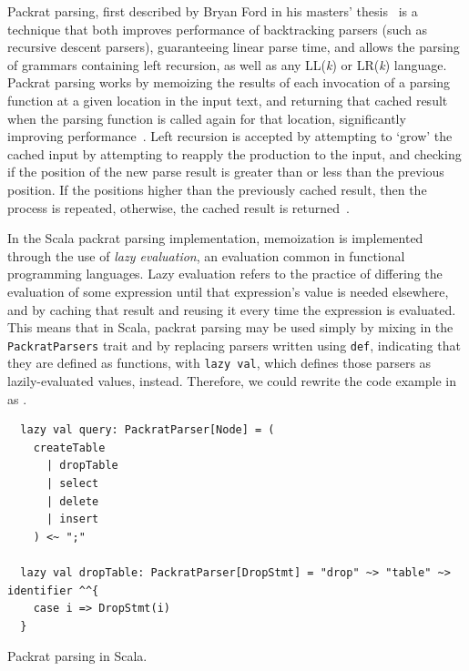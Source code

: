 Packrat parsing, first described by Bryan Ford in his masters' thesis~\cite{ford2002packrat} is a technique that both improves performance of backtracking parsers (such as recursive descent parsers), guaranteeing linear parse time, and allows the parsing of grammars containing left recursion, as well as any LL(\textit{k}) or LR(\textit{k}) language. Packrat parsing works by memoizing the results of each invocation of a parsing function at a given location in the input text, and returning that cached result when the parsing function is called again for that location, significantly improving performance~\cite{jonnalagedda2009packrat,ford2002packrat,ford2002packrat2}. Left recursion is accepted by attempting to `grow' the cached input by attempting to reapply the production to the input, and checking if the position of the new parse result is greater than or less than the previous position. If the positions higher than the previously cached result, then the process is repeated, otherwise, the cached result is returned~\cite{jonnalagedda2009packrat,ford2002packrat}.

In the Scala packrat parsing implementation, memoization is implemented through the use of \textit{lazy evaluation}, an evaluation common in functional programming languages. Lazy evaluation refers to the practice of differing the evaluation of some expression until that expression's value is needed elsewhere, and by caching that result and reusing it every time the expression is evaluated. This means that in Scala, packrat parsing may be used simply by mixing in the \texttt{PackratParsers} trait and by replacing parsers written using \texttt{def}, indicating that they are defined as functions, with \texttt{lazy val}, which defines those parsers as lazily-evaluated values, instead. Therefore, we could rewrite the code example in  as .
\begin{listing}[h]
    \begin{verbatim}
  lazy val query: PackratParser[Node] = (
    createTable
      | dropTable
      | select
      | delete
      | insert
    ) <~ ";"
    
  lazy val dropTable: PackratParser[DropStmt] = "drop" ~> "table" ~> identifier ^^{
    case i => DropStmt(i)
  }
    \end{verbatim}
    \caption{Packrat parsing in Scala.}
    \label{lst:packrat1}
\end{listing}

